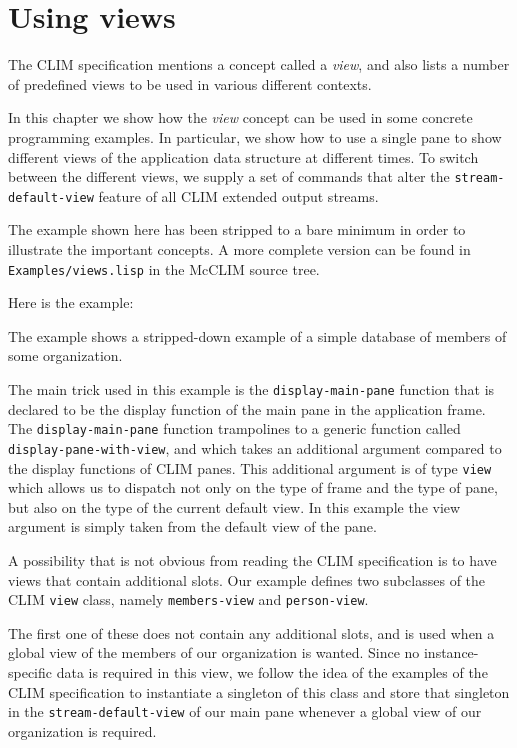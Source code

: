 \chapter{Using views}

The CLIM specification mentions a concept called a \emph{view}, and
also lists a number of predefined views to be used in various
different contexts.

In this chapter we show how the \emph{view} concept can be used in
some concrete programming examples.  In particular, we show how to use
a single pane to show different views of the application data
structure at different times.  To switch between the different views,
we supply a set of commands that alter the
\texttt{stream-default-view} feature of all CLIM extended output
streams.

The example shown here has been stripped to a bare minimum in order to
illustrate the important concepts.  A more complete version can be
found in \texttt{Examples/views.lisp} in the McCLIM source tree.

Here is the example:



The example shows a stripped-down example of a simple database of
members of some organization.

The main trick used in this example is the \texttt{display-main-pane}
function that is declared to be the display function of the main pane
in the application frame.  The \texttt{display-main-pane} function
trampolines to a generic function called
\texttt{display-pane-with-view}, and which takes an additional
argument compared to the display functions of CLIM panes.  This
additional argument is of type \texttt{view} which allows us to
dispatch not only on the type of frame and the type of pane, but also
on the type of the current default view.  In this example the view
argument is simply taken from the default view of the pane.

A possibility that is not obvious from reading the CLIM specification
is to have views that contain additional slots.  Our example defines
two subclasses of the CLIM \texttt{view} class, namely
\texttt{members-view} and \texttt{person-view}.

The first one of these does not contain any additional slots, and is
used when a global view of the members of our organization is wanted.
Since no instance-specific data is required in this view, we follow
the idea of the examples of the CLIM specification to instantiate a
singleton of this class and store that singleton in the
\texttt{stream-default-view} of our main pane whenever a global view
of our organization is required.

